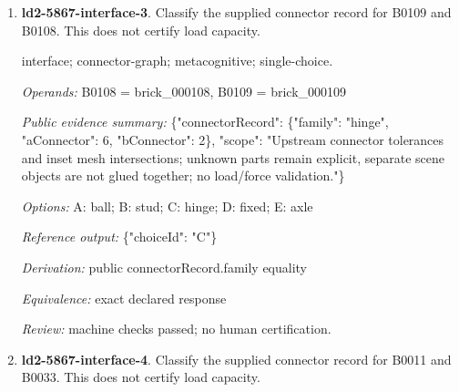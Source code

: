\begin{enumerate}
\par{\small interface; connector-graph; metacognitive; single-choice.\par\textit{Operands:} B0271 = brick\_000271, B0275 = brick\_000275\par\textit{Public evidence summary:} \{"connectorRecord": \{"family": "fixed", "aConnector": 2, "bConnector": 0\}, "scope": "Upstream connector tolerances and inset mesh intersections; unknown parts remain explicit, separate scene objects are not glued together; no load/force validation."\}\par\textit{Options:} A: ball; B: hinge; C: axle; D: fixed; E: stud\par\textit{Reference output:} \{"choiceId": "D"\}\par\textit{Derivation:} public connectorRecord.family equality\par\textit{Equivalence:} exact declared response\par\textit{Review:} machine checks passed; no human certification.}
\item \textbf{ld2-5867-interface-3}. Classify the supplied connector record for B0109 and B0108. This does not certify load capacity.
\par{\small interface; connector-graph; metacognitive; single-choice.\par\textit{Operands:} B0108 = brick\_000108, B0109 = brick\_000109\par\textit{Public evidence summary:} \{"connectorRecord": \{"family": "hinge", "aConnector": 6, "bConnector": 2\}, "scope": "Upstream connector tolerances and inset mesh intersections; unknown parts remain explicit, separate scene objects are not glued together; no load/force validation."\}\par\textit{Options:} A: ball; B: stud; C: hinge; D: fixed; E: axle\par\textit{Reference output:} \{"choiceId": "C"\}\par\textit{Derivation:} public connectorRecord.family equality\par\textit{Equivalence:} exact declared response\par\textit{Review:} machine checks passed; no human certification.}
\item \textbf{ld2-5867-interface-4}. Classify the supplied connector record for B0011 and B0033. This does not certify load capacity.

\end{enumerate}
